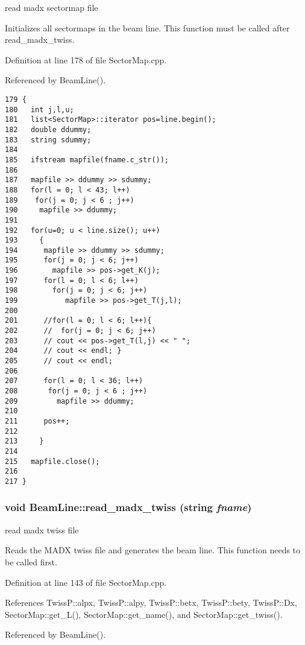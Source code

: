 read madx sectormap file

Initializes all sectormaps in the beam line. This function must be called after read\_\-madx\_\-twiss. 

Definition at line 178 of file Sector\-Map.cpp.

Referenced by Beam\-Line().



\footnotesize\begin{verbatim}179 {
180   int j,l,u;
181   list<SectorMap>::iterator pos=line.begin();
182   double ddummy;
183   string sdummy;  
184 
185   ifstream mapfile(fname.c_str());
186   
187   mapfile >> ddummy >> sdummy;
188   for(l = 0; l < 43; l++)
189    for(j = 0; j < 6 ; j++)  
190     mapfile >> ddummy;
191 
192   for(u=0; u < line.size(); u++)   
193     {
194      mapfile >> ddummy >> sdummy;
195      for(j = 0; j < 6; j++)
196        mapfile >> pos->get_K(j); 
197      for(l = 0; l < 6; l++) 
198        for(j = 0; j < 6; j++)
199           mapfile >> pos->get_T(j,l);
200 
201      //for(l = 0; l < 6; l++){ 
202      //  for(j = 0; j < 6; j++)
203      // cout << pos->get_T(l,j) << " ";
204      // cout << endl; }
205      // cout << endl;
206 
207      for(l = 0; l < 36; l++)
208       for(j = 0; j < 6 ; j++)  
209         mapfile >> ddummy;
210 
211      pos++; 
212 
213     }
214   
215   mapfile.close();
216   
217 }
\end{verbatim}\normalsize 
{}
\subsubsection{\setlength{\rightskip}{0pt plus 5cm}void Beam\-Line::read\_\-madx\_\-twiss (string {\em fname})}\label{classBeamLine_a6}


read madx twiss file

Reads the MADX twiss file and generates the beam line. This function needs to be called first. 

Definition at line 143 of file Sector\-Map.cpp.

References Twiss\-P::alpx, Twiss\-P::alpy, Twiss\-P::betx, Twiss\-P::bety, Twiss\-P::Dx, Sector\-Map::get\_\-L(), Sector\-Map::get\_\-name(), and Sector\-Map::get\_\-twiss().

Referenced by Beam\-Line().




